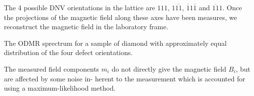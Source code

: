 The 4 possible DNV orientations in the lattice are $111$, $1\overline{11}$, $\overline{1}1\overline{1}$ and $\overline{11}1$.
Once the projections of the magnetic field along these axes have been measures, we reconstruct the magnetic field in the laboratory frame.

The ODMR sprectrum for a sample of diamond with approximately equal distribution of the four defect orientations.

The measured field components $m_i$ do not directly give the magnetic field $B_i$, but are affected by some noise in-
herent to the measurement which is accounted for using a maximum-likelihood method.

%
%

\cite{Balasubramanian2008}


